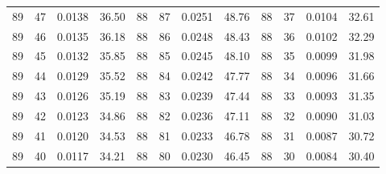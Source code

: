 \begin{tabular}{llll|llll|llll}
89 & 47 & 0.0138 & 36.50 & 88 & 87 & 0.0251 & 48.76 & 88 & 37 & 0.0104 & 32.61\\
89 & 46 & 0.0135 & 36.18 & 88 & 86 & 0.0248 & 48.43 & 88 & 36 & 0.0102 & 32.29\\
89 & 45 & 0.0132 & 35.85 & 88 & 85 & 0.0245 & 48.10 & 88 & 35 & 0.0099 & 31.98\\
89 & 44 & 0.0129 & 35.52 & 88 & 84 & 0.0242 & 47.77 & 88 & 34 & 0.0096 & 31.66\\
89 & 43 & 0.0126 & 35.19 & 88 & 83 & 0.0239 & 47.44 & 88 & 33 & 0.0093 & 31.35\\
89 & 42 & 0.0123 & 34.86 & 88 & 82 & 0.0236 & 47.11 & 88 & 32 & 0.0090 & 31.03\\
89 & 41 & 0.0120 & 34.53 & 88 & 81 & 0.0233 & 46.78 & 88 & 31 & 0.0087 & 30.72\\
89 & 40 & 0.0117 & 34.21 & 88 & 80 & 0.0230 & 46.45 & 88 & 30 & 0.0084 & 30.40\\
\bottomrule
\end{tabular}
\newpage
